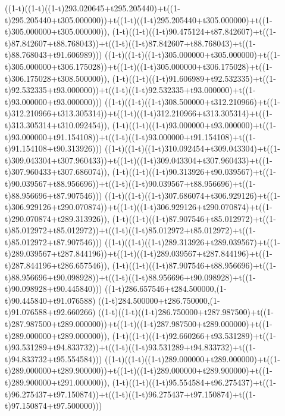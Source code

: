 ((1-t)((1-t)((1-t)293.020645+t295.205440)+t((1-t)295.205440+t305.000000))+t((1-t)((1-t)295.205440+t305.000000)+t((1-t)305.000000+t305.000000)),                                     (1-t)((1-t)((1-t)90.475124+t87.842607)+t((1-t)87.842607+t88.768043))+t((1-t)((1-t)87.842607+t88.768043)+t((1-t)88.768043+t91.606989)))
((1-t)((1-t)((1-t)305.000000+t305.000000)+t((1-t)305.000000+t306.175028))+t((1-t)((1-t)305.000000+t306.175028)+t((1-t)306.175028+t308.500000)),                                     (1-t)((1-t)((1-t)91.606989+t92.532335)+t((1-t)92.532335+t93.000000))+t((1-t)((1-t)92.532335+t93.000000)+t((1-t)93.000000+t93.000000)))
((1-t)((1-t)((1-t)308.500000+t312.210966)+t((1-t)312.210966+t313.305314))+t((1-t)((1-t)312.210966+t313.305314)+t((1-t)313.305314+t310.092454)),                                     (1-t)((1-t)((1-t)93.000000+t93.000000)+t((1-t)93.000000+t91.154108))+t((1-t)((1-t)93.000000+t91.154108)+t((1-t)91.154108+t90.313926)))
((1-t)((1-t)((1-t)310.092454+t309.043304)+t((1-t)309.043304+t307.960433))+t((1-t)((1-t)309.043304+t307.960433)+t((1-t)307.960433+t307.686074)),                                     (1-t)((1-t)((1-t)90.313926+t90.039567)+t((1-t)90.039567+t88.956696))+t((1-t)((1-t)90.039567+t88.956696)+t((1-t)88.956696+t87.907546)))
((1-t)((1-t)((1-t)307.686074+t306.929126)+t((1-t)306.929126+t290.070874))+t((1-t)((1-t)306.929126+t290.070874)+t((1-t)290.070874+t289.313926)),                                     (1-t)((1-t)((1-t)87.907546+t85.012972)+t((1-t)85.012972+t85.012972))+t((1-t)((1-t)85.012972+t85.012972)+t((1-t)85.012972+t87.907546)))
((1-t)((1-t)((1-t)289.313926+t289.039567)+t((1-t)289.039567+t287.844196))+t((1-t)((1-t)289.039567+t287.844196)+t((1-t)287.844196+t286.657546)),                                     (1-t)((1-t)((1-t)87.907546+t88.956696)+t((1-t)88.956696+t90.098928))+t((1-t)((1-t)88.956696+t90.098928)+t((1-t)90.098928+t90.445840)))
((1-t)286.657546+t284.500000,(1-t)90.445840+t91.076588)
((1-t)284.500000+t286.750000,(1-t)91.076588+t92.660266)
((1-t)((1-t)((1-t)286.750000+t287.987500)+t((1-t)287.987500+t289.000000))+t((1-t)((1-t)287.987500+t289.000000)+t((1-t)289.000000+t289.000000)),                                     (1-t)((1-t)((1-t)92.660266+t93.531289)+t((1-t)93.531289+t94.833732))+t((1-t)((1-t)93.531289+t94.833732)+t((1-t)94.833732+t95.554584)))
((1-t)((1-t)((1-t)289.000000+t289.000000)+t((1-t)289.000000+t289.900000))+t((1-t)((1-t)289.000000+t289.900000)+t((1-t)289.900000+t291.000000)),                                     (1-t)((1-t)((1-t)95.554584+t96.275437)+t((1-t)96.275437+t97.150874))+t((1-t)((1-t)96.275437+t97.150874)+t((1-t)97.150874+t97.500000)))
